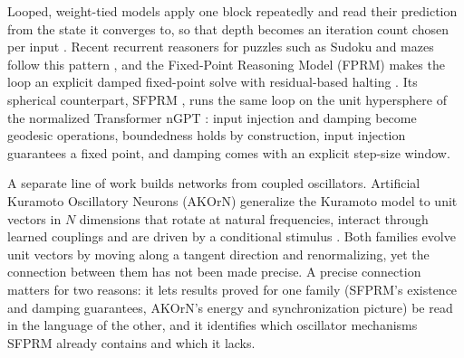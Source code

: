 \documentclass{article}
\theoremstyle{plain}
\theoremstyle{definition}
\theoremstyle{remark}
\begin{document}
Looped, weight-tied models apply one block repeatedly and read their prediction from the state it
converges to, so that depth becomes an iteration count chosen per input
\citep{dehghani2019universal,bai2019deq}. Recent recurrent reasoners for puzzles such as Sudoku and
mazes follow this pattern \citep{wang2025hrm,jolicoeur2025trm}, and the Fixed-Point Reasoning Model
(FPRM) makes the loop an explicit damped fixed-point solve with residual-based halting
\citep{movahedi2026fprm}. Its spherical counterpart, SFPRM \citep{sfprm}, runs the same loop on the
unit hypersphere of the normalized Transformer nGPT \citep{loshchilov2025ngpt}: input injection and
damping become geodesic operations, boundedness holds by construction, input injection guarantees a
fixed point, and damping comes with an explicit step-size window.

A separate line of work builds networks from coupled oscillators. Artificial Kuramoto Oscillatory
Neurons (AKOrN) generalize the Kuramoto model \citep{kuramoto1984} to unit vectors in $N$ dimensions
that rotate at natural frequencies, interact through learned couplings and are driven by a
conditional stimulus \citep{miyato2025akorn}. Both families evolve unit vectors by moving along a
tangent direction and renormalizing, yet the connection between them has not been made precise. A
precise connection matters for two reasons: it lets results proved for one family (SFPRM's existence
and damping guarantees, AKOrN's energy and synchronization picture) be read in the language of the
other, and it identifies which oscillator mechanisms SFPRM already contains and which it lacks.
\end{document}

